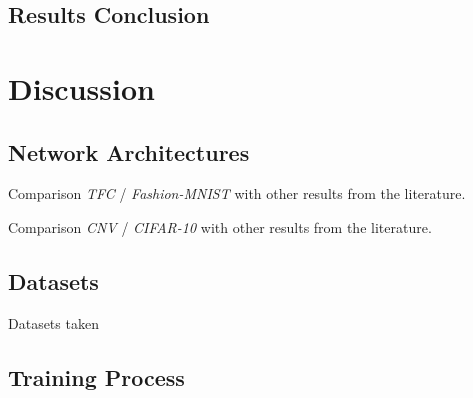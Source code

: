 
\subsection{Results Conclusion}



\section{Discussion}


\subsection{Network Architectures}

Comparison \emph{TFC} / \emph{Fashion-MNIST} with other results from the literature.

Comparison \emph{CNV} / \emph{CIFAR-10} with other results from the literature.


\subsection{Datasets}

Datasets taken



\subsection{Training Process}

